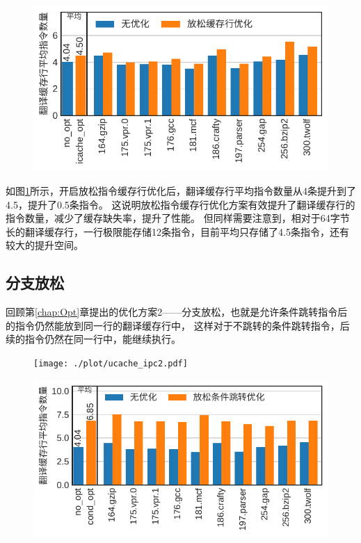 \begin{figure}[!htbp]
  \centering
  \includegraphics[width=0.8\linewidth]{./plot/ucacheline_nums1.pdf}
  \label{img:ucacheline_nums1}
\end{figure}


如图\ref{img:ucacheline_nums1}所示，开启放松指令缓存行优化后，翻译缓存行平均指令数量从4条提升到了4.5，提升了0.5条指令。
这说明放松指令缓存行优化方案有效提升了翻译缓存行的指令数量，减少了缓存缺失率，提升了性能。
但同样需要注意到，相对于64字节长的翻译缓存行，一行极限能存储12条指令，目前平均只存储了4.5条指令，还有较大的提升空间。

\subsection{分支放松}

回顾第\ref{chap:Opt}章提出的优化方案2——分支放松，也就是允许条件跳转指令后的指令仍然能放到同一行的翻译缓存行中，
这样对于不跳转的条件跳转指令，后续的指令仍然在同一行中，能继续执行。

\begin{figure}[!htbp]
  \centering
  \texttt{[image: ./plot/ucache\_ipc2.pdf]}
  \label{img:ipc2}
\end{figure}

\begin{figure}[!htbp]
  \centering
  \includegraphics[width=0.8\linewidth]{./plot/ucacheline_nums2.pdf}
  \label{img:ucacheline_nums2}
\end{figure}


